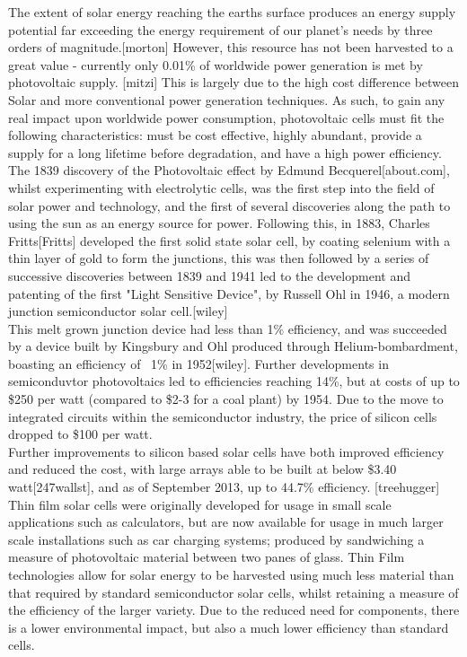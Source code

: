 The extent of solar energy reaching the earths surface produces an energy supply potential far exceeding the energy requirement of our planet's needs by three orders of magnitude.[morton] However, this resource has not been harvested to a great value - currently only 0.01\% of worldwide power generation is met by photovoltaic supply. [mitzi] This is largely due to the high cost difference between Solar and more conventional power generation techniques. As such, to gain any real impact upon worldwide power consumption, photovoltaic cells must fit the following characteristics: must be cost effective, highly abundant, provide a supply for a long lifetime before degradation, and have a high power efficiency. 
\\The 1839 discovery of the Photovoltaic effect by Edmund Becquerel[about.com], whilst experimenting with electrolytic cells, was the first step into the field of solar power and technology, and the first of several discoveries along the path to using the sun as an energy source for power. Following this, in 1883, Charles Fritts[Fritts] developed the first solid state solar cell, by coating selenium with a thin layer of gold to form the junctions, this was then followed by a series of successive discoveries between 1839 and 1941 led to the development and patenting of the first "Light Sensitive Device", by Russell Ohl in 1946, a modern junction semiconductor solar cell.[wiley] \\This melt grown junction device had less than 1\% efficiency, and was succeeded by a device built by Kingsbury and Ohl produced through Helium-bombardment, boasting an efficiency of ~1\% in 1952[wiley]. Further developments in semiconduvtor photovoltaics led to efficiencies reaching 14\%, but at costs of up to \$250 per watt (compared to \$2-3 for a coal plant) by 1954. Due to the move to integrated circuits within the semiconductor industry, the price of silicon cells dropped to \$100 per watt.
\\ Further improvements to silicon based solar cells have both improved efficiency and reduced the cost, with large arrays able to be built at below \$3.40  watt[247wallst], and as of September 2013, up to 44.7\% efficiency. [treehugger]
Thin film solar cells were originally developed for usage in small scale applications such as calculators, but are now available for usage in much larger scale installations such as car charging systems; produced by sandwiching a measure of photovoltaic material between two panes of glass. Thin Film technologies allow for solar energy to be harvested using much less material than that required by standard semiconductor solar cells, whilst retaining a measure of the efficiency of the larger variety. Due to the reduced need for components, there is a lower environmental impact, but also a much lower efficiency than standard cells.
